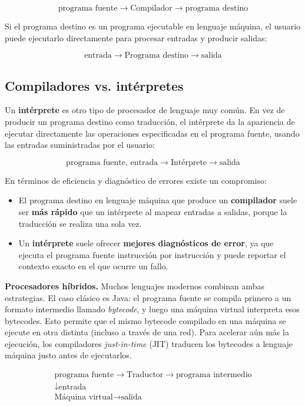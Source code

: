 \documentclass[11pt,a4paper]{article}
\begin{document}
\[
\text{programa fuente} \longrightarrow \boxed{\text{Compilador}} \longrightarrow \text{programa destino}
\]

Si el programa destino es un programa ejecutable en lenguaje máquina, el usuario puede
ejecutarlo directamente para procesar entradas y producir salidas:

\[
\text{entrada} \longrightarrow \boxed{\text{Programa destino}} \longrightarrow \text{salida}
\]

\subsection{Compiladores vs. intérpretes}

Un \textbf{intérprete} es otro tipo de procesador de lenguaje muy común. En vez de producir un
programa destino como traducción, el intérprete da la apariencia de ejecutar directamente las
operaciones especificadas en el programa fuente, usando las entradas suministradas por el
usuario:

\[
\text{programa fuente, entrada} \longrightarrow \boxed{\text{Intérprete}} \longrightarrow \text{salida}
\]

En términos de eficiencia y diagnóstico de errores existe un compromiso:

\begin{itemize}
    \item El programa destino en lenguaje máquina que produce un \textbf{compilador} suele ser
    \textbf{más rápido} que un intérprete al mapear entradas a salidas, porque la traducción se
    realiza una sola vez.
    \item Un \textbf{intérprete} suele ofrecer \textbf{mejores diagnósticos de error}, ya que
    ejecuta el programa fuente instrucción por instrucción y puede reportar el contexto exacto en
    el que ocurre un fallo.
\end{itemize}

\textbf{Procesadores híbridos.} Muchos lenguajes modernos combinan ambas estrategias. El caso
clásico es Java: el programa fuente se compila primero a un formato intermedio llamado
\textit{bytecode}, y luego una máquina virtual interpreta esos bytecodes. Esto permite que el
mismo bytecode compilado en una máquina se ejecute en otra distinta (incluso a través de una
red). Para acelerar aún más la ejecución, los compiladores \textit{just-in-time} (JIT) traducen
los bytecodes a lenguaje máquina justo antes de ejecutarlos.

\[
\begin{array}{c}
\text{programa fuente} \to \boxed{\text{Traductor}} \to \text{programa intermedio} \\[4pt]
\downarrow \text{entrada} \\[2pt]
\boxed{\text{Máquina virtual}} \to \text{salida}
\end{array}
\]
\end{document}
